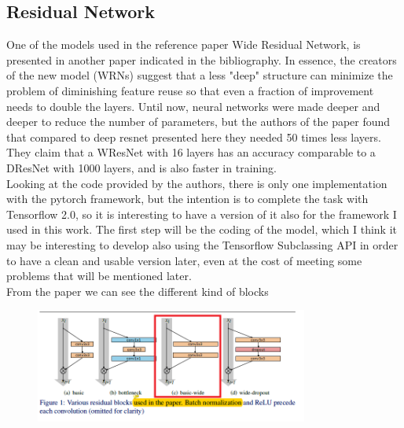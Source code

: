 \subsection{Residual Network}
One of the models used in the reference paper Wide Residual Network, is presented in another paper indicated in the bibliography\cite{wresnet}. In essence, the creators of the new model (WRNs) suggest that a less "deep" structure can minimize the problem of diminishing feature reuse so that even a fraction of improvement needs to double the layers. Until now, neural networks were made deeper and deeper to reduce the number of parameters, but the authors of the paper found that compared to deep resnet presented here \cite{deepresnet} they needed 50 times less layers.\\
They claim that a WResNet with 16 layers has an accuracy comparable to a DResNet with 1000 layers, and is also faster in training.\\
Looking at the code provided by the authors, there is only one implementation with the pytorch framework, but the intention is to complete the task with 
Tensorflow 2.0, so it is interesting to have a version of it also for the framework I used in this work.
\newpage
The first step will be the coding of the model, which I think it may be interesting to develop also using the Tensorflow Subclassing API in order to have a clean and usable version later, even at the cost of meeting some problems that will be mentioned later.\\
From the paper\cite{wresnet} we can see the different kind of blocks\\

\begin{figure}[h!]
\centering
\includegraphics[width=0.8\textwidth]{wresnet.png}
\end{figure}

